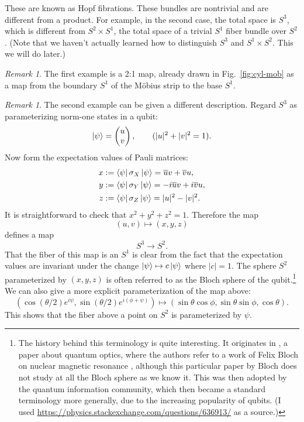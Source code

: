 \documentclass[12pt]{article}
\numberwithin{equation}{section}
\numberwithin{figure}{section}
\theoremstyle{remark}
\newtheorem{remark}[definition]{Remark}
\let\bar\overline
\begin{document}
These are known as Hopf fibrations.
These bundles are nontrivial
and are different from a product.
For example, in the second case,
the total space is $S^3$,
which is different from $S^2\times S^1$,
the total space of a trivial $S^1$ fiber bundle over $S^2$.
(Note that we haven't actually learned how to distinguish
$S^3$ and $S^1\times S^2$.
This we will do later.)

\begin{remark}
The first example is a 2:1 map,
already drawn in Fig.~\ref{fig:cyl-mob} 
as a map from the boundary $S^1$ of the M\"obius strip to the base $S^1$.
\end{remark}
\begin{remark}
The second example can be given a different description. 
Regard $S^3$ as parameterizing norm-one states
in a qubit:
\begin{equation}
  \ket{\psi}=\begin{pmatrix}u \\v \end{pmatrix},
  \qquad (|u|^2+|v|^2=1).
\end{equation}
Now form the expectation values of Pauli matrices:
\begin{align}
  x &:= \bra{\psi} \sigma_X \ket{\psi} = \bar u v + \bar v u, \\
  y &:= \bra{\psi} \sigma_Y \ket{\psi} = -i\bar u v +i \bar v u, \\
  z &:= \bra{\psi} \sigma_Z \ket{\psi} = |u|^2 - |v|^2.
\end{align}
It is straightforward to check that $x^2+y^2+z^2=1$.
Therefore the map \begin{equation}
(u,v)\mapsto (x,y,z)
\label{eq:uvXYZ}
\end{equation} defines a map \begin{equation}
  S^3\to S^2.
\end{equation}
That the fiber of this map is an $S^1$ is clear from the fact
that the expectation values are invariant under the change
$\ket{\psi}\mapsto c\ket{\psi}$ where $|c|=1$.
The sphere $S^2$ parameterized by $(x,y,z)$ is often referred to as the Bloch sphere of the qubit.\footnote{%
The history behind this terminology is quite interesting.
It originates in \cite{ACGT}, a paper about quantum optics,
where the authors refer to a work of Felix Bloch on nuclear magnetic resonance \cite{Bloch}, 
although this particular paper by Bloch does not study at all the Bloch sphere as we know it.
This was then adopted by the quantum information community,
which then became a standard terminology more generally, due to the increasing popularity of qubits. 
(I used \url{https://physics.stackexchange.com/questions/636913/} as a source.)
}
We can also give a more explicit parameterization of the map above:
\begin{equation}
  \label{eq:Hopf-explicit}
(\cos(\theta/2)  e^{i \psi},
\sin(\theta/2) e^{i(\phi+\psi)} )
\mapsto  (\sin\theta\cos\phi,\sin\theta\sin\phi,\cos\theta).
\end{equation}
This shows that the fiber above a point on $S^2$ is parameterized by $\psi$.


\end{remark}
\end{document}
